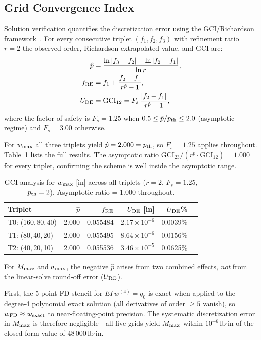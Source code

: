\documentclass[10pt,twocolumn]{article}
\begin{document}
\subsection{Grid Convergence Index}
\label{sec:gci}

Solution verification quantifies the discretization error using the
GCI/Richardson framework~\cite{roache1994,celik2008}.
For every consecutive triplet $(f_1,f_2,f_3)$ with refinement ratio $r=2$
the observed order, Richardson-extrapolated value, and GCI are:
\begin{align}
  \hat{p} &= \frac{\ln|f_3-f_2|-\ln|f_2-f_1|}{\ln r},\\
  f_{\rm RE} &= f_1 + \frac{f_2-f_1}{r^{\hat{p}}-1},\\
  U_{\rm DE} &= \mathrm{GCI}_{12} = F_s\,\frac{|f_2-f_1|}{r^{\hat{p}}-1},
\end{align}
where the factor of safety is $F_s=1.25$ when
$0.5\le\hat{p}/p_{\rm th}\le2.0$ (asymptotic regime)
and $F_s=3.00$ otherwise.

For $w_{\rm max}$ all three triplets yield $\hat{p}=2.000=p_{\rm th}$,
so $F_s=1.25$ applies throughout.
Table~\ref{tab:gci_all} lists the full results.
The asymptotic ratio $\mathrm{GCI}_{23}/(r^{\hat{p}}\cdot\mathrm{GCI}_{12})=1.000$
for every triplet, confirming the scheme is well inside the asymptotic range.

\begin{table}[ht]
\centering
\caption{GCI analysis for $w_{\rm max}$ [in] across all triplets
  ($r=2$, $F_s=1.25$, $p_{\rm th}=2$). Asymptotic ratio = 1.000 throughout.}
\label{tab:gci_all}
\footnotesize
\setlength{\tabcolsep}{3pt}
\begin{tabular}{@{}lrrrrr@{}}
\toprule
Triplet & $\hat{p}$ & $f_{\rm RE}$ & $U_{\rm DE}$ [in] & $U_{\rm DE}$\% \\
\midrule
T0: (160,\,80,\,40) & 2.000 & 0.055484 & $2.17\times10^{-6}$ & 0.0039\%\\
T1: (80,\,40,\,20)  & 2.000 & 0.055495 & $8.64\times10^{-6}$ & 0.0156\%\\
T2: (40,\,20,\,10)  & 2.000 & 0.055536 & $3.46\times10^{-5}$ & 0.0625\%\\
\bottomrule
\end{tabular}
\end{table}

For $M_{\rm max}$ and $\sigma_{\rm max}$, the negative $\hat{p}$ arises
from two combined effects, \emph{not} from the linear-solve round-off error
($U_{\rm RO}$).

First, the 5-point FD stencil for $EI\,w^{(4)}=q_0$ is exact when applied
to the degree-4 polynomial exact solution (all derivatives of order $\ge5$
vanish), so $w_{\rm FD}\approx w_{\rm exact}$ to near-floating-point
precision.  The systematic discretization error in $M_{\rm max}$ is
therefore negligible---all five grids yield $M_{\rm max}$ within
$10^{-6}$\,lb$\cdot$in of the closed-form value of $48\,000$\,lb$\cdot$in.
\end{document}
